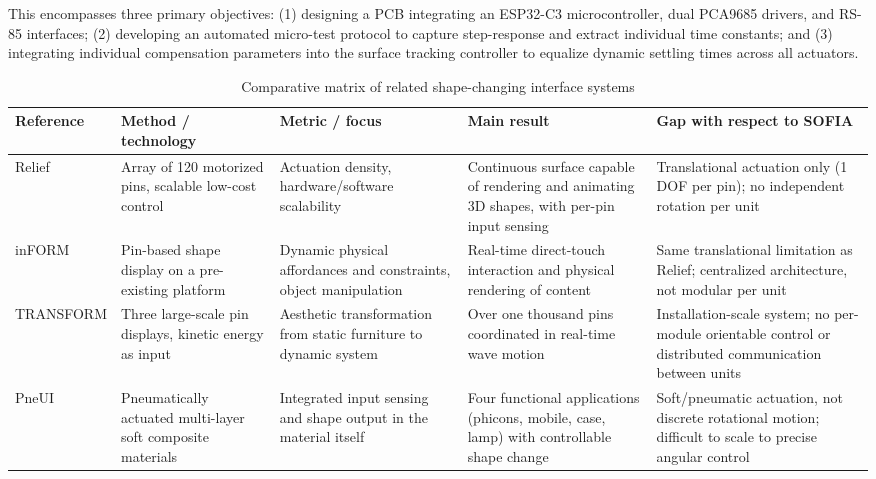 \documentclass[lettersize,journal]{IEEEtran}
\begin{document}
	This encompasses three primary objectives: (1) designing a PCB integrating an ESP32-C3 microcontroller, dual PCA9685 drivers, and RS-85 interfaces; (2) developing an automated micro-test protocol to capture step-response and extract individual time constants; and (3) integrating individual compensation parameters into the surface tracking controller to equalize dynamic settling times across all actuators.
	
	\begin{table}[!t]
		\centering
		\caption{Comparative matrix of related shape-changing interface systems}
		\label{tab:related_work_matrix}
		\scriptsize
		
		\setlength{\tabcolsep}{3pt}
		\renewcommand{\arraystretch}{1.1}
		
		\begin{tabularx}{\textwidth}
			{@{}P{2.2cm} P{3cm} P{3cm} P{4cm} Y@{}}
			
			\toprule
			Reference & Method / technology & Metric / focus & Main result & Gap with respect to SOFIA \\
			\midrule
			
			Relief \cite{leithinger2010relief} &
			Array of 120 motorized pins, scalable low-cost control &
			Actuation density, hardware/software scalability &
			Continuous surface capable of rendering and animating 3D shapes, with per-pin input sensing &
			Translational actuation only (1 DOF per pin); no independent rotation per unit \\
			
			inFORM \cite{follmer2013inform} &
			Pin-based shape display on a pre-existing platform &
			Dynamic physical affordances and constraints, object manipulation &
			Real-time direct-touch interaction and physical rendering of content &
			Same translational limitation as Relief; centralized architecture, not modular per unit \\
			
			TRANSFORM \cite{ishii2015transform} &
			Three large-scale pin displays, kinetic energy as input &
			Aesthetic transformation from static furniture to dynamic system &
			Over one thousand pins coordinated in real-time wave motion &
			Installation-scale system; no per-module orientable control or distributed communication between units \\
			
			PneUI \cite{yao2013pneui} &
			Pneumatically actuated multi-layer soft composite materials &
			Integrated input sensing and shape output in the material itself &
			Four functional applications (phicons, mobile, case, lamp) with controllable shape change &
			Soft/pneumatic actuation, not discrete rotational motion; difficult to scale to precise angular control \\
			

\end{tabularx}
\end{table}
\end{document}
